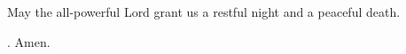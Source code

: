 \lettrine[lines=2]{M}{}ay the all-powerful Lord grant us a restful night and a peaceful death.
\par \Rbar. Amen.